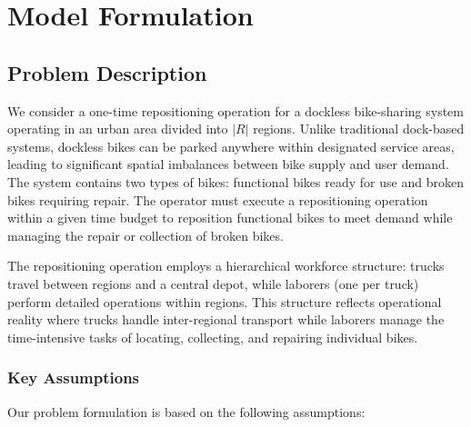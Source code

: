 \section{Model Formulation}

\subsection{Problem Description}

We consider a one-time repositioning operation for a dockless bike-sharing system operating in an urban area divided into $|R|$ regions. Unlike traditional dock-based systems, dockless bikes can be parked anywhere within designated service areas, leading to significant spatial imbalances between bike supply and user demand. The system contains two types of bikes: functional bikes ready for use and broken bikes requiring repair. The operator must execute a repositioning operation within a given time budget to reposition functional bikes to meet demand while managing the repair or collection of broken bikes.

The repositioning operation employs a hierarchical workforce structure: trucks travel between regions and a central depot, while laborers (one per truck) perform detailed operations within regions. This structure reflects operational reality where trucks handle inter-regional transport while laborers manage the time-intensive tasks of locating, collecting, and repairing individual bikes.

\subsubsection{Key Assumptions}

Our problem formulation is based on the following assumptions:

